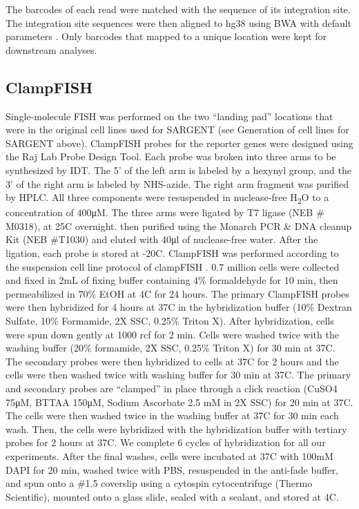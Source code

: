 The barcodes of each read were matched with the sequence of its integration site. The integration site sequences were then aligned to hg38 using BWA with default parameters \cite{lih_durbinr:FastAccurate2009}. Only barcodes that mapped to a unique location were kept for downstream analyses. 

\subsection*{ClampFISH}
 
Single-molecule FISH was performed on the two \enquote{landing pad} locations that were in the original cell lines used for SARGENT (see Generation of cell lines for SARGENT above). ClampFISH probes for the reporter genes were designed using the Raj Lab Probe Design Tool. Each probe was broken into three arms to be synthesized by IDT. The 5’ of the left arm is labeled by a hexynyl group, and the 3’ of the right arm is labeled by NHS-azide. The right arm fragment was purified by HPLC. All three components were resuspended in nuclease-free H\textsubscript{2}O to a concentration of 400μM. The three arms were ligated by T7 ligase (NEB \# M0318), at 25\dg C overnight. then purified using the Monarch PCR \& DNA cleanup Kit (NEB \#T1030) and eluted with 40μl of nuclease-free water. After the ligation, each probe is stored at -20\dg C. ClampFISH was performed according to the suspension cell line protocol of clampFISH \cite{rouhanifardsh_raja:ClampFISHDetects2019}. 0.7 million cells were collected and fixed in 2mL of fixing buffer containing 4\% formaldehyde for 10 min, then permeabilized in 70\% EtOH at 4\dg C for 24 hours. The primary ClampFISH probes were then hybridized for 4 hours at 37\dg C in the hybridization buffer (10\% Dextran Sulfate, 10\% Formamide, 2X SSC, 0.25\% Triton X). After hybridization, cells were spun down gently at 1000 rcf for 2 min. Cells were washed twice with the washing buffer (20\% formamide, 2X SSC, 0.25\% Triton X) for 30 min at 37\dg C. The secondary probes were then hybridized to cells at 37\dg C for 2 hours and the cells were then washed twice with washing buffer for 30 min at 37\dg C. The primary and secondary probes are \enquote{clamped} in place through a click reaction (CuSO4 75μM, BTTAA 150μM, Sodium Ascorbate 2.5 mM in 2X SSC) for 20 min at 37\dg C. The cells were then washed twice in the washing buffer at 37\dg C for 30 min each wash. Then, the cells were hybridized with the hybridization buffer with tertiary probes for 2 hours at 37\dg C. We complete 6 cycles of hybridization for all our experiments. After the final washes, cells were incubated at 37\dg C with 100mM DAPI for 20 min, washed twice with PBS, resuspended in the anti-fade buffer, and spun onto a \#1.5 coverslip using a cytospin cytocentrifuge (Thermo Scientific), mounted onto a glass slide, sealed with a sealant, and stored at 4\dg C. 

